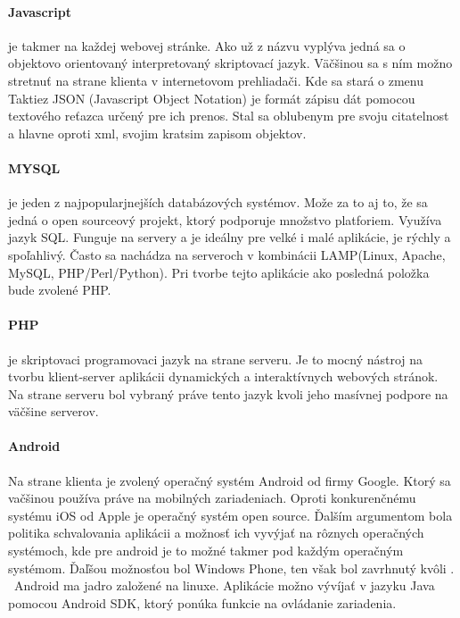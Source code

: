 \paragraph{Javascript} je takmer na každej webovej stránke. Ako už z názvu vyplýva jedná sa o objektovo orientovaný interpretovaný skriptovací jazyk. Väčšinou sa s ním možno stretnuť na strane klienta v internetovom prehliadači. Kde sa stará o zmenu Taktiez JSON (Javascript Object Notation) je formát zápisu dát pomocou textového reťazca určený pre ich prenos. Stal sa oblubenym pre svoju citatelnost a hlavne oproti xml, svojim kratsim zapisom objektov. 

\paragraph{MYSQL} je jeden z najpopularjnejších databázových systémov. Može za to aj to, že sa jedná o open sourceový projekt, ktorý podporuje množstvo platforiem. Využíva jazyk SQL. Funguje na servery a je ideálny pre velké i malé aplikácie, je rýchly a spoľahlivý. Často sa nachádza na serveroch v kombinácii LAMP(Linux, Apache, MySQL, PHP/Perl/Python). Pri tvorbe tejto aplikácie ako posledná položka bude zvolené PHP.

\paragraph{PHP} je skriptovaci programovaci jazyk na strane serveru. Je to mocný nástroj na tvorbu klient-server aplikácii dynamických a interaktívnych webových stránok. Na strane serveru bol vybraný práve tento jazyk kvoli jeho masívnej podpore na väčšine serverov.

\paragraph{Android} Na strane klienta je zvolený operačný systém Android od firmy Google. Ktorý sa vačšinou používa práve na mobilných zariadeniach. Oproti konkurenčnému systému iOS od Apple je operačný systém open source. Ďalším argumentom bola politika schvalovania aplikácii a možnosť ich vyvýjať na rôznych operačných systémoch, kde pre android je to možné takmer pod každým operačným systémom. Ďaľšou možnosťou bol Windows Phone, ten však bol zavrhnutý kvôli . \
Android ma jadro založené na linuxe. Aplikácie možno vývíjať v jazyku Java pomocou Android SDK, ktorý ponúka funkcie na ovládanie zariadenia.



